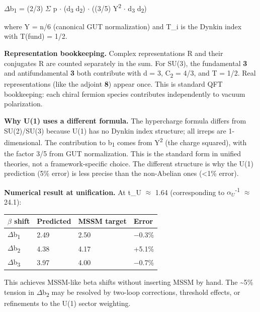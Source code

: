 \documentclass[11pt,a4paper]{article}
\theoremstyle{remark}
\begin{document}
\ensuremath{\Delta}b\textsubscript{1} = (2/3) \ensuremath{\Sigma} p \ensuremath{\cdot} (d\textsubscript{3} d\textsubscript{2}) \ensuremath{\cdot} ((3/5) Y\textsuperscript{2} \ensuremath{\cdot} d\textsubscript{3} d\textsubscript{2})

where Y = n/6 (canonical GUT normalization) and T\_i is the Dynkin index with T(fund) = 1/2.

\textbf{Representation bookkeeping.} Complex representations R and their conjugates R are counted separately in the sum. For SU(3), the fundamental \textbf{3} and antifundamental \textbf{3} both contribute with d = 3, C\textsubscript{2} = 4/3, and T = 1/2. Real representations (like the adjoint \textbf{8}) appear once. This is standard QFT bookkeeping: each chiral fermion species contributes independently to vacuum polarization.

\textbf{Why U(1) uses a different formula.} The hypercharge formula differs from SU(2)/SU(3) because U(1) has no Dynkin index structure; all irreps are 1-dimensional. The contribution to b\textsubscript{1} comes from Y\textsuperscript{2} (the charge squared), with the factor 3/5 from GUT normalization. This is the standard form in unified theories, not a framework-specific choice. The different structure is why the U(1) prediction (5\% error) is less precise than the non-Abelian ones (\textless1\% error).

\textbf{Numerical result at unification.} At t\_U \ensuremath{\approx} 1.64 (corresponding to $\alpha_U$\textsuperscript{-1} \ensuremath{\approx} 24.1):

{\def\LTcaptype{none} %
\begin{longtable}[]{@{}llll@{}}
\toprule\noalign{}
\ensuremath{\beta} shift & Predicted & MSSM target & Error \\
\midrule\noalign{}
\endhead
\bottomrule\noalign{}
\endlastfoot
\ensuremath{\Delta}b\textsubscript{1} & 2.49 & 2.50 & \ensuremath{-}0.3\% \\
\ensuremath{\Delta}b\textsubscript{2} & 4.38 & 4.17 & +5.1\% \\
\ensuremath{\Delta}b\textsubscript{3} & 3.97 & 4.00 & \ensuremath{-}0.7\% \\
\end{longtable}
}

This achieves MSSM-like beta shifts without inserting MSSM by hand. The \textasciitilde5\% tension in \ensuremath{\Delta}b\textsubscript{2} may be resolved by two-loop corrections, threshold effects, or refinements to the U(1) sector weighting.
\end{document}
